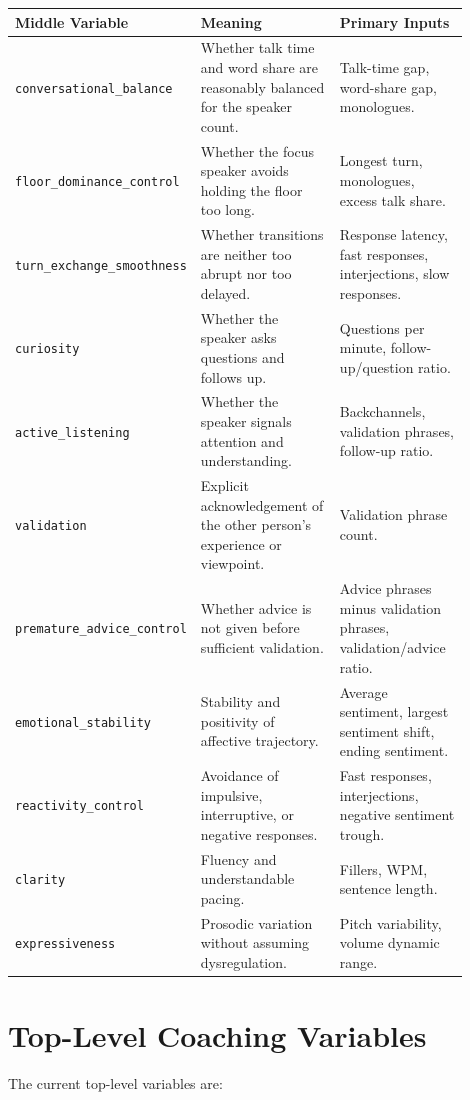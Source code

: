 \documentclass[11pt]{article}
\begin{document}
\begin{longtable}{p{0.26\linewidth}p{0.34\linewidth}p{0.30\linewidth}}
\toprule
\textbf{Middle Variable} & \textbf{Meaning} & \textbf{Primary Inputs} \\
\midrule
\texttt{conversational\_balance} & Whether talk time and word share are reasonably balanced for the speaker count. & Talk-time gap, word-share gap, monologues. \\
\texttt{floor\_dominance\_control} & Whether the focus speaker avoids holding the floor too long. & Longest turn, monologues, excess talk share. \\
\texttt{turn\_exchange\_smoothness} & Whether transitions are neither too abrupt nor too delayed. & Response latency, fast responses, interjections, slow responses. \\
\texttt{curiosity} & Whether the speaker asks questions and follows up. & Questions per minute, follow-up/question ratio. \\
\texttt{active\_listening} & Whether the speaker signals attention and understanding. & Backchannels, validation phrases, follow-up ratio. \\
\texttt{validation} & Explicit acknowledgement of the other person's experience or viewpoint. & Validation phrase count. \\
\texttt{premature\_advice\_control} & Whether advice is not given before sufficient validation. & Advice phrases minus validation phrases, validation/advice ratio. \\
\texttt{emotional\_stability} & Stability and positivity of affective trajectory. & Average sentiment, largest sentiment shift, ending sentiment. \\
\texttt{reactivity\_control} & Avoidance of impulsive, interruptive, or negative responses. & Fast responses, interjections, negative sentiment trough. \\
\texttt{clarity} & Fluency and understandable pacing. & Fillers, WPM, sentence length. \\
\texttt{expressiveness} & Prosodic variation without assuming dysregulation. & Pitch variability, volume dynamic range. \\
\bottomrule
\end{longtable}

\section{Top-Level Coaching Variables}

The current top-level variables are:
\end{document}
